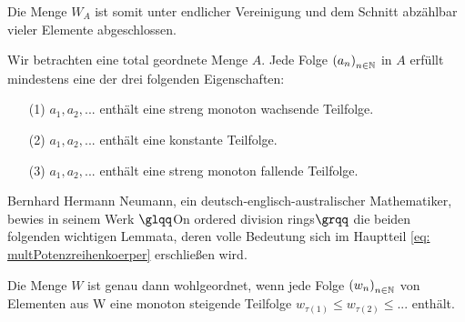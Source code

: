 %
%
%
%
% 
%
%
%
%
Die Menge $W_A$ ist somit unter endlicher Vereinigung und dem Schnitt abzählbar vieler Elemente abgeschlossen.
\begin{lemma}\label{unendlicheFolgeEigenschaften}
Wir betrachten eine total geordnete Menge $A$. Jede Folge $\left(a_n\right)_{n \in \mathbb{N}}$ in $A$ erfüllt mindestens eine der drei folgenden Eigenschaften:
\begin{enumerate}
\item[(1)] $a_1, a_2, ...$ enthält eine streng monoton wachsende Teilfolge.
\item[(2)] $a_1, a_2, ...$ enthält eine konstante Teilfolge.
\item[(3)] $a_1, a_2, ...$ enthält eine streng monoton fallende Teilfolge.
\end{enumerate}
%
\end{lemma}
%
Bernhard Hermann Neumann, ein deutsch-englisch-australischer Mathematiker, bewies in seinem Werk $\glqq$On ordered division rings$\grqq$ \cite[S. 206]{neumann49} die beiden folgenden wichtigen Lemmata, deren volle Bedeutung sich im Hauptteil \ref{eq: multPotenzreihenkoerper} erschließen wird. 
\begin{lemma}\label{wohlgeordnetwennkeineabfallendeFolge} %
Die Menge $W$ ist genau dann wohlgeordnet, wenn jede Folge $\left(w_n\right)_{n\in\mathbb{N}}$ von Elementen aus W eine monoton steigende Teilfolge  $w_{\tau(1)} \le w_{\tau(2)} \le ...$ enthält.
\end{lemma}
